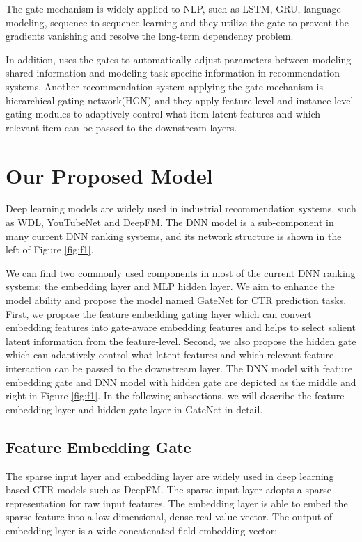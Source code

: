\documentclass[sigconf,nonacm=true]{acmart}
\begin{document}
The gate mechanism is widely applied to NLP, such as LSTM\cite{gers1999learning}, GRU\cite{cho2014learning}, language modeling\cite{dauphin2017language}, sequence to sequence learning\cite{gehring2017convolutional}
and they utilize the gate to prevent the gradients vanishing and resolve the long-term dependency problem.


In addition, \cite{ma2018modeling} uses the gates to automatically adjust parameters between modeling shared information and modeling task-specific information in recommendation systems. Another recommendation system applying the gate mechanism is hierarchical gating network(HGN)\cite{ma2019hierarchical} and they apply feature-level and instance-level gating
modules to adaptively control what item latent features and which relevant item can be passed to the downstream layers.



\section{Our Proposed Model}
\label{sec:s3}




Deep learning models are widely used in industrial recommendation systems, such as WDL, YouTubeNet\cite{covington2016deep} and DeepFM.
The DNN model is a sub-component in many current DNN ranking systems, and its network structure is shown in the left of Figure \ref{fig:f1}. 


We can find two commonly used components in most of the current DNN ranking systems: the embedding layer and MLP hidden layer. 
We aim to enhance the model ability and propose the model named GateNet for CTR prediction tasks. 
First, we propose the feature embedding gating layer which can convert embedding features into gate-aware embedding features and helps to select salient latent information from the feature-level. 
Second, we also propose the hidden gate which can adaptively control what latent features and which relevant feature interaction can be passed to the downstream layer.
The DNN model with feature embedding gate and DNN model with hidden gate are depicted as the middle and right in Figure \ref{fig:f1}. In the following subsections, we will describe the feature embedding layer and hidden gate layer in GateNet in detail.

\subsection{Feature Embedding Gate}
\label{sec:s31}
The sparse input layer and embedding layer are widely used in deep learning based CTR models such as DeepFM\cite{guo2017deepfm}.
The sparse input layer adopts a sparse representation for raw input features. 
The embedding layer is able to embed the sparse feature into a low dimensional, dense real-value vector. 
The output of embedding layer is a wide concatenated field embedding vector:
\end{document}
